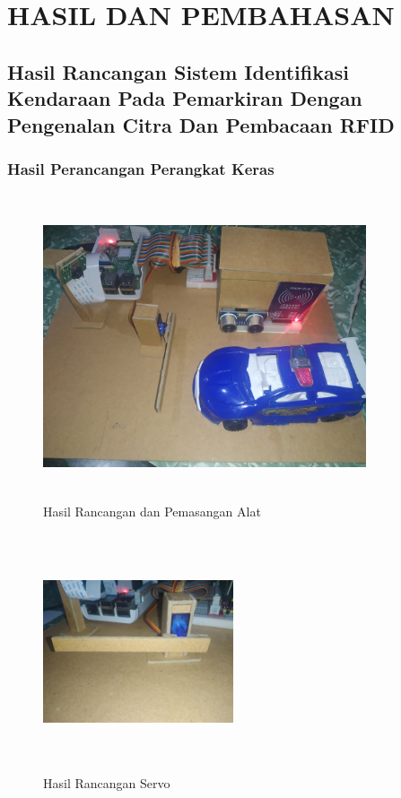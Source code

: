 \chapter{HASIL DAN PEMBAHASAN}

\section{Hasil Rancangan Sistem Identifikasi Kendaraan Pada Pemarkiran Dengan Pengenalan Citra Dan Pembacaan RFID}

\subsection{Hasil Perancangan Perangkat Keras}
\begin{figure} [H]
    \includegraphics[height=9cm, width=0.85\textwidth, center]{images/alat-full-mobil.jpg}
    \caption{Hasil Rancangan dan Pemasangan Alat}
    \label{fig:alatfullmobil}
\end{figure}

\begin{figure} [H]
    \includegraphics[height=7cm, width=0.5\textwidth, center]{images/alat-servo.jpg}
    \caption{Hasil Rancangan Servo}
    \label{fig:alatservo}
\end{figure}

